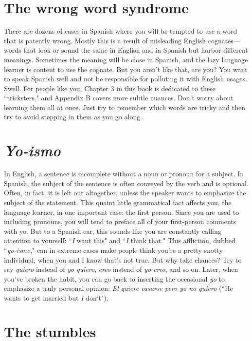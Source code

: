 \section{The wrong word syndrome}

There are dozens of cases in Spanish where you will be
tempted to use a word that is patently wrong. Mostly this is a result of
misleading English cognates---words that look or sound the same in
English and in Spanish but harbor different meanings. Sometimes the
meaning will be close in Spanish, and the lazy language learner is content to use the cognate. But you aren't like that, are you? You want to
speak Spanish well and not be responsible for polluting it with English
usages. Swell. For people like you, Chapter 3 in this book is dedicated
to these ``tricksters," and Appendix B covers more subtle nuances.
Don't worry about learning them all at once. Just try to remember
which words are tricky and then try to avoid stepping in them as you
go along.

\section{\emph{Yo-ismo}}

In English, a sentence is incomplete without a noun or pronoun for a subject. In Spanish, the subject of the sentence is often conveyed by the verb and is optional. Often, in fact, it is left out altogether, unless the speaker wants to emphasize the subject of the
statement. This quaint little grammatical fact affects you, the language
learner, in one important case: the first person. Since you are used to
including pronouns, you will tend to preface all of your first-person
comments with yo. But to a Spanish ear, this sounds like you are constantly calling attention to yourself: ``\emph{I} want this" and ``\emph{I} think that."
This affliction, dubbed ``\emph{yo-ismo}," can in extreme cases make people
think you're a pretty snotty individual, when you and I know that's not
true. But why take chances? Try to say \emph{quiero} instead of \emph{yo quiero},
\emph{creo} instead of \emph{yo creo}, and so on. Later, when you've broken the habit,
you can go back to inserting the occasional \emph{yo} to emphasize a truly
personal opinion: \emph{El quiere casarse pero yo no quiero} (``He wants to
get married but \emph{I} don't").

\section{The stumbles}

